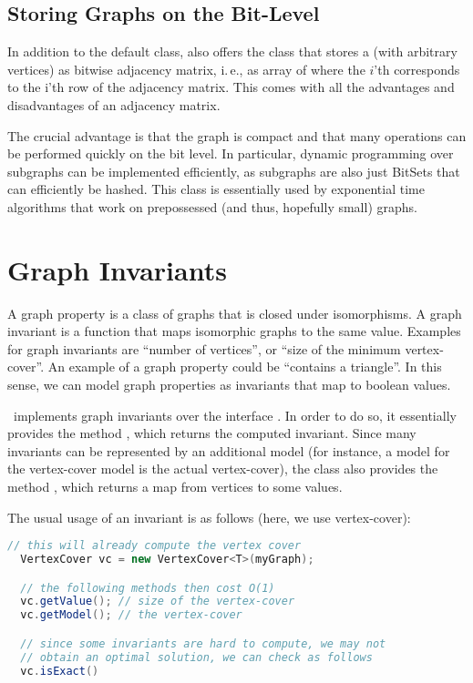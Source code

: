 \documentclass[a4paper, ukenglish, twoside, openright]{jdrasilmanual}
\begin{document}
\section{Storing Graphs on the Bit-Level}
In addition to the default  class, \Jdrasil{} also offers the
class  that stores a  (with
arbitrary vertices) as bitwise adjacency matrix, i.\,e., as array of
 where the $i$'th  corresponds to the i'th row of the
adjacency matrix. This comes with all the advantages and disadvantages
of an adjacency matrix.
 
The crucial advantage is that the graph is compact and that many
operations can be performed quickly on the bit level.  In particular,
dynamic programming over subgraphs can be implemented efficiently, as
subgraphs are also just BitSets that can efficiently be hashed. This
class is essentially used by exponential time algorithms that work on
prepossessed (and thus, hopefully small) graphs.

\chapter{Graph Invariants}
A graph property is a class of graphs that is closed under
isomorphisms. A graph invariant is a function that maps isomorphic
graphs to the same value. Examples for graph invariants are ``number of
vertices'', or ``size of the minimum vertex-cover''. An example of a
graph property could be ``contains a triangle''. In this sense, we can
model graph properties as invariants that map to boolean values.

\Jdrasil\ implements graph invariants over the interface . In order to do so, it
essentially provides the method , which returns the
computed invariant.  Since many invariants can be represented by an
additional model (for instance, a model for the vertex-cover model
is the actual vertex-cover), the class also provides the method
, which returns a map from vertices to some values.

The usual usage of an invariant is as follows (here, we use
vertex-cover):
\begin{lstlisting}[language=Java]
  // this will already compute the vertex cover
  VertexCover vc = new VertexCover<T>(myGraph);

  // the following methods then cost O(1)
  vc.getValue(); // size of the vertex-cover
  vc.getModel(); // the vertex-cover

  // since some invariants are hard to compute, we may not 
  // obtain an optimal solution, we can check as follows
  vc.isExact()
\end{lstlisting}
\end{document}
